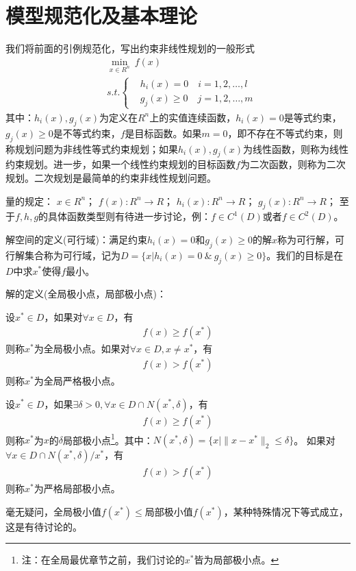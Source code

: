 \section{模型规范化及基本理论}
    \par
    我们将前面的引例规范化，写出约束非线性规划的一般形式
    \begin{align*}
    &\mathop {\min}\limits_{x\in R^n} \ f(x)\\
    &s.t.\left\{
    \begin{aligned}
    &h_i(x)=0\quad i=1,2,\ldots,l\\
    &g_j(x) \geqslant 0\quad j=1,2,\ldots,m
    \end{aligned}
    \right.
    \end{align*}
    其中：$h_i(x),g_j(x)$为定义在$R^n$上的实值连续函数，$h_i(x)=0$是等式约束，$g_j(x) \geqslant 0$是不等式约束，$f$是目标函数。如果$m=0$，即不存在不等式约束，则称规划问题为非线性等式约束规划；如果$h_i(x),g_j(x)$为线性函数，则称为线性约束规划。进一步，如果一个线性约束规划的目标函数$f$为二次函数，则称为二次规划。二次规划是最简单的约束非线性规划问题。
    \par
    量的规定：
    $x\in R^n$；
    $f(x):R^n \to R$；
    $h_i(x):R^n \to R$；
    $g_j(x):R^n \to R$；
    至于$f,h,g$的具体函数类型则有待进一步讨论，例：$f \in C^1(D)$或者$f \in C^{2}(D)$。
    \par
    解空间的定义(可行域)：满足约束$h_i(x)=0$和$g_j(x) \geqslant 0$的解$x$称为可行解，可行解集合称为可行域，记为$D=\{x|h_i(x)=0 \ \&\  g_j(x) \geqslant 0\}$。我们的目标是在$D$中求$x^*$使得$f$最小。
    \par
    解的定义(全局极小点，局部极小点)：\par
    \begin{definition}[全局极小点]
    设$x^* \in D$，如果对$\forall x \in D$，有
    \begin{align*}
    f(x) \geqslant f(x^*)
    \end{align*}
    则称$x^*$为全局极小点。如果对$\forall x \in D,x \neq x^*$，有
    \begin{align*}
    f(x) > f(x^*)
    \end{align*}
    则称$x^*$为全局严格极小点。
    \end{definition}
    \begin{definition}[局部极小点]
    设$x^* \in D$，如果$\exists \delta >0,\forall x \in D \cap N(x^*,\delta)$，有
    \begin{align*}
    f(x) \geqslant f(x^*)
    \end{align*}
    则称$x^*$为$x$的$\delta$局部极小点\footnote{注：在全局最优章节之前，我们讨论的$x^*$皆为局部极小点。}。其中：$N(x^*,\delta)=\{x\big|\|x-x^*\|_2 \leqslant \delta\}$。
    如果对$\forall x \in D \cap N(x^*,\delta)/x^*$，有
    \begin{align*}
    f(x) > f(x^*)
    \end{align*}
    则称$x^*$为严格局部极小点。
    \end{definition}
    \par
    毫无疑问，全局极小值$f(x^*) \leqslant \text{局部极小值}f(x^*)$，某种特殊情况下等式成立，这是有待讨论的。
